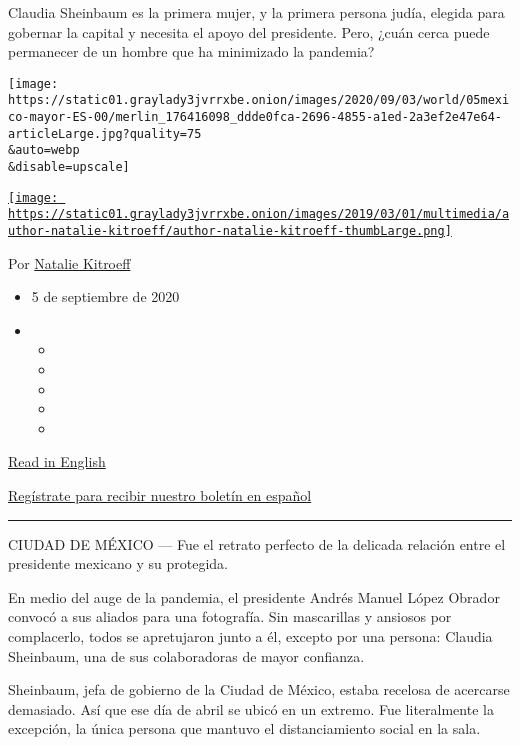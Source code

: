 Claudia Sheinbaum es la primera mujer, y la primera persona judía,
elegida para gobernar la capital y necesita el apoyo del presidente.
Pero, ¿cuán cerca puede permanecer de un hombre que ha minimizado la
pandemia?

\texttt{[image: https://static01.graylady3jvrrxbe.onion/images/2020/09/03/world/05mexico-mayor-ES-00/merlin\_176416098\_ddde0fca-2696-4855-a1ed-2a3ef2e47e64-articleLarge.jpg?quality=75\\\&auto=webp\\\&disable=upscale]}

\href{https://www.nytimes3xbfgragh.onion/by/natalie-kitroeff}{\texttt{[image: https://static01.graylady3jvrrxbe.onion/images/2019/03/01/multimedia/author-natalie-kitroeff/author-natalie-kitroeff-thumbLarge.png]}}

Por
\href{https://www.nytimes3xbfgragh.onion/by/natalie-kitroeff}{Natalie
Kitroeff}

\begin{itemize}
\item
  5 de septiembre de 2020
\item
  \begin{itemize}
  \item
  \item
  \item
  \item
  \item
  \end{itemize}
\end{itemize}

\href{https://www.nytimes3xbfgragh.onion/2020/09/05/world/americas/mexico-mayor-amlo-sheinbaum.html}{Read
in English}

\href{https://www.nytimes3xbfgragh.onion/newsletters/el-times}{Regístrate
para recibir nuestro boletín en español}

\begin{center}\rule{0.5\linewidth}{\linethickness}\end{center}

CIUDAD DE MÉXICO --- Fue el retrato perfecto de la delicada relación
entre el presidente mexicano y su protegida.

En medio del auge de la pandemia, el presidente Andrés Manuel López
Obrador convocó a sus aliados para una fotografía. Sin mascarillas y
ansiosos por complacerlo, todos se apretujaron junto a él, excepto por
una persona: Claudia Sheinbaum, una de sus colaboradoras de mayor
confianza.

Sheinbaum, jefa de gobierno de la Ciudad de México, estaba recelosa de
acercarse demasiado. Así que ese día de abril se ubicó en un extremo.
Fue literalmente la excepción, la única persona que mantuvo el
distanciamiento social en la sala.

